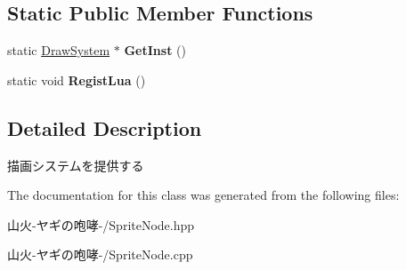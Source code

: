 \subsection*{Static Public Member Functions}
\begin{DoxyCompactItemize}
\item 
static \hyperlink{class_draw_system}{Draw\+System} $\ast$ {\bfseries Get\+Inst} ()\hypertarget{class_draw_system_a2fc7f9c286b296a186df6dc1824291e6}{}\label{class_draw_system_a2fc7f9c286b296a186df6dc1824291e6}

\item 
static void {\bfseries Regist\+Lua} ()\hypertarget{class_draw_system_aea7beebfb1c694ad8ae23aa5128445b0}{}\label{class_draw_system_aea7beebfb1c694ad8ae23aa5128445b0}

\end{DoxyCompactItemize}


\subsection{Detailed Description}
描画システムを提供する 

The documentation for this class was generated from the following files\+:\begin{DoxyCompactItemize}
\item 
山火-\/ヤギの咆哮-\//Sprite\+Node.\+hpp\item 
山火-\/ヤギの咆哮-\//Sprite\+Node.\+cpp\end{DoxyCompactItemize}
